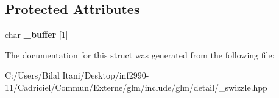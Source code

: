 \subsection*{Protected Attributes}
\begin{DoxyCompactItemize}
\item 
char {\bfseries \+\_\+buffer} \mbox{[}1\mbox{]}\hypertarget{structglm_1_1detail_1_1__swizzle__base0_afd4b7f15c9acff4cdef808f559ffec2d}{}\label{structglm_1_1detail_1_1__swizzle__base0_afd4b7f15c9acff4cdef808f559ffec2d}

\end{DoxyCompactItemize}


The documentation for this struct was generated from the following file\+:\begin{DoxyCompactItemize}
\item 
C\+:/\+Users/\+Bilal Itani/\+Desktop/inf2990-\/11/\+Cadriciel/\+Commun/\+Externe/glm/include/glm/detail/\+\_\+swizzle.\+hpp\end{DoxyCompactItemize}

